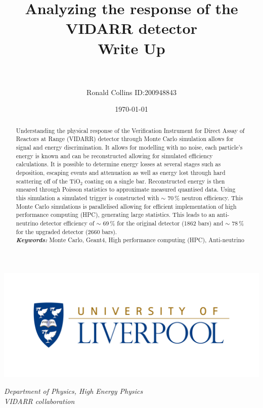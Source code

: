 \documentclass[12pt,a4paper]{article}
\title{Analyzing the response of the VIDARR detector\\
	\large Write Up\\~\\}
\date{\today}
\author{Ronald Collins ID:200948843}
\newenvironment{Figure}
  {\par\medskip\noindent\minipage{\linewidth}}
  {\endminipage\par\medskip}
\begin{document}
\maketitle

\begin{Figure}
 \centering
 \includegraphics[width=1.0\linewidth]{Liverpool_logo}
\end{Figure}


\begin{center}
\textit{Department of Physics, High Energy Physics\\}
\textit{VIDARR collaboration\\}
\end{center}


\newpage
{}
\begin{abstract}
\normalsize Understanding the physical response of the Verification Instrument for Direct Assay of Reactors at Range (VIDARR) detector through Monte Carlo simulation allows for signal and energy discrimination. It allows for modelling with no noise, each particle's energy is known and can be reconstructed allowing for simulated efficiency calculations. It is possible to determine energy losses at several stages such as deposition, escaping events and attenuation as well as energy lost through hard scattering off of the TiO$_2$ coating on a single bar.  Reconstructed energy is then smeared through Poisson statistics to approximate measured quantised data. Using this simulation a simulated trigger is constructed with $\sim$ 70\,\% neutron efficiency. This Monte Carlo simulations is parallelised allowing for efficient implementation of high performance computing (HPC), generating large statistics. This leads to an anti-neutrino detector efficiency of $\sim$ 69\,\% for the original detector (1862 bars) and $\sim$ 78\,\% for the upgraded detector (2660 bars).\\
\providecommand{\keywords}[1]{\textbf{\textit{Keywords:}} #1} %
\keywords{Monte Carlo, Geant4, High performance computing (HPC), Anti-neutrino}
\end{abstract}
\vspace{5mm} %
\tableofcontents
\newpage
\end{document}
